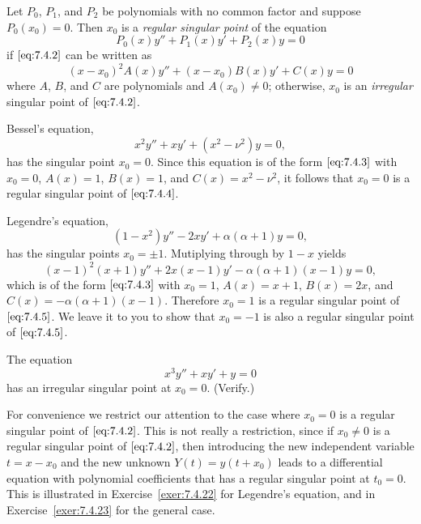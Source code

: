 \documentclass{ximera}
\begin{document}
\begin{definition}\label{thmtype:7.4.1}
Let $P_0$, $P_1$, and $P_2$ be polynomials with no common factor and
suppose  $P_0(x_0)=0$. Then $x_0$ is a \textit{regular singular
point} of the equation
\begin{equation} \label{eq:7.4.2}
P_0(x)y''+P_1(x)y'+P_2(x)y=0
\end{equation}
if $\eqref{eq:7.4.2}$ can be written as
\begin{equation} \label{eq:7.4.3}
(x-x_0)^2A(x)y''+(x-x_0)B(x)y'+C(x)y=0
\end{equation}
where $A$, $B$, and $C$ are polynomials and $A(x_0)\neq0$;   otherwise,
$x_0$ is an \textit{irregular} singular point of $\eqref{eq:7.4.2}$.
\end{definition}

\begin{example}\label{example:7.4.1}
Bessel's equation,
\begin{equation} \label{eq:7.4.4}
x^2y''+xy'+(x^2-\nu^2)y=0,
\end{equation}
has the singular point $x_0=0$. Since this equation is of the form
$\eqref{eq:7.4.3}$ with $x_0=0$, $A(x)=1$, $B(x)=1$, and $C(x)=x^2-\nu^2$,
it follows that $x_0=0$ is a regular singular point of
$\eqref{eq:7.4.4}$.
 \end{example}

\begin{example}\label{example:7.4.2}
Legendre's equation,
\begin{equation} \label{eq:7.4.5}
(1-x^2)y''-2xy'+\alpha(\alpha+1)y=0,
\end{equation}
has the singular points $x_0=\pm1$. Mutiplying through by $1-x$
yields
$$
(x-1)^2(x+1)y''+2x(x-1)y'-\alpha(\alpha+1)(x-1)y=0,
$$
which is of the form $\eqref{eq:7.4.3}$ with $x_0=1$, $A(x)=x+1$,
$B(x)=2x$, and $C(x)=-\alpha(\alpha+1)(x-1)$. Therefore $x_0=1$
is a regular singular point of $\eqref{eq:7.4.5}$. We leave it to you to show that $x_0=-1$ is also a regular singular point of
$\eqref{eq:7.4.5}$.
\end{example}

\begin{example}\label{example:7.4.3}
The equation
$$
x^3y''+xy'+y=0
$$
has an irregular  singular point at $x_0=0$. (Verify.)
\end{example}

For convenience we restrict our attention to the case where $x_0=0$ is a regular singular point of $\eqref{eq:7.4.2}$. This is not really a restriction, since if $x_0\neq0$ is a regular singular point of
$\eqref{eq:7.4.2}$, then  introducing the new independent variable $t=x-x_0$
and the new unknown $Y(t)=y(t+x_0)$ leads to a differential equation
with polynomial coefficients that has a regular singular point at $t_0=0$. 
This is illustrated in Exercise~\ref{exer:7.4.22} for Legendre's equation, and in Exercise~\ref{exer:7.4.23} for the general case.
\end{document}
